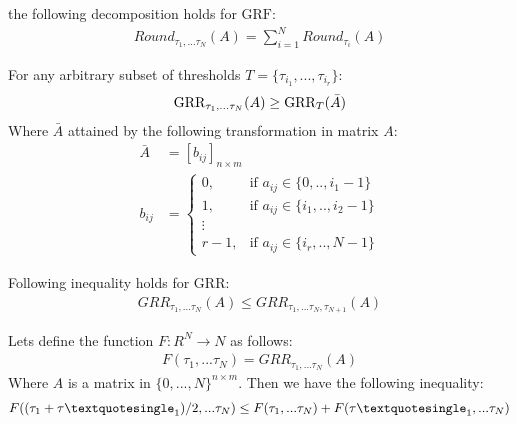 \documentclass{article}
\begin{document}
\begin{thm:lemma}

the following decomposition holds for $\text{GRF}$:
\begin{align}
Round_{\tau_1,...\tau_N}(A)=\sum\limits_{i=1}^{N}Round_{\tau_i}(A)
\end{align}
\end{thm:lemma}

\begin{thm:lemma}

For any arbitrary subset of thresholds $T=\{\tau_{i_1},...,\tau_{i_r}\}$:
\begin{align}
\text{GRR}_{\tau_1,...\tau_N}(A)\geq \text{GRR}_{T}(\bar A)
\end{align}
Where $\bar A$ attained by the following transformation in matrix $A$:
\begin{align}
\bar A & =[b_{ij}]_{n\times m}\\
b_{ij} & =
\begin{cases}
	0, & \text{if } a_{ij} \in \{0,..,i_{1}-1\} \\
	1, & \text{if } a_{ij} \in\{i_{1},..,i_{2}-1\} \\
	\vdots\\
	r-1, & \text{if } a_{ij} \in\{i_{r},..,N-1\} 
\end{cases}
\end{align}
\end{thm:lemma}

\begin{thm:lemma}

Following inequality holds for GRR:
\begin{align}
GRR_{\tau_{1},...\tau_{N}}(A)\leq GRR_{\tau_1,...\tau_N,\tau_{N+1}}(A)
\end{align}
\end{thm:lemma}

\begin{thm:lemma}

Lets define the function $F: R^N \rightarrow N$ as follows:
\begin{align}
F(\tau_{1},...\tau_{N})= GRR_{\tau_1,...\tau_N}(A)
\end{align}
Where $A$ is a matrix in $\{0,...,N\}^{n\times m}$. Then we have the following inequality:
\begin{align}
F((\tau_{1}+\tau\textquotesingle_{1})/2,...\tau_{N}) \leq F(\tau_{1},...\tau_{N})+F(\tau\textquotesingle_{1},...\tau_{N})
\end{align}
\end{thm:lemma}
\end{document}
